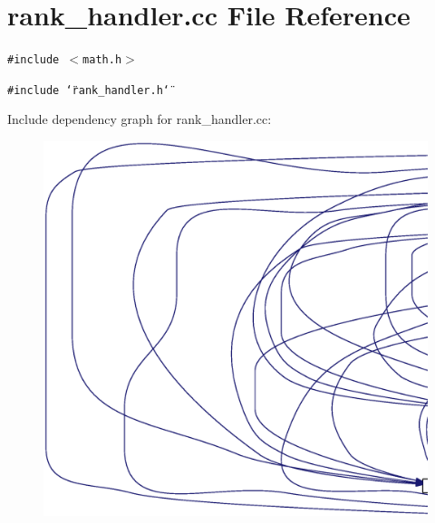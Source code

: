 \section{rank\_\-handler.cc File Reference}
\label{rank__handler_8cc}
{\tt \#include $<$math.h$>$}\par
{\tt \#include \char`\"{}rank\_\-handler.h\char`\"{}}\par


Include dependency graph for rank\_\-handler.cc:\nopagebreak
\begin{figure}[H]
\begin{center}
\leavevmode
\includegraphics[width=420pt]{rank__handler_8cc__incl}
\end{center}
\end{figure}
